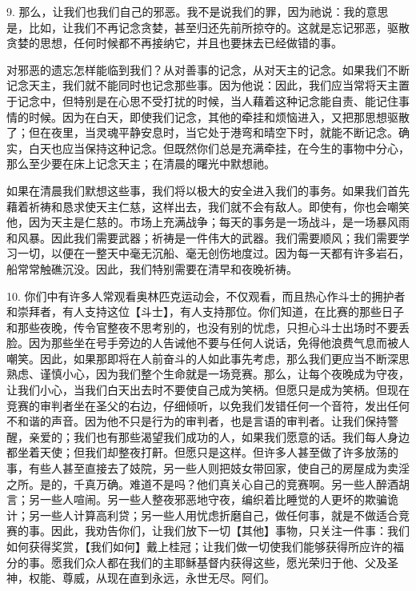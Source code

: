 9. 那么，让我们也我们自己的邪恶。我不是说我们的罪，因为祂说：我的意思是，比如，让我们不再记念贪婪，甚至归还先前所掠夺的。这就是忘记邪恶，驱散贪婪的思想，任何时候都不再接纳它，并且也要抹去已经做错的事。\par

对邪恶的遗忘怎样能临到我们？从对善事的记念，从对天主的记念。如果我们不断记念天主，我们就不能同时也记念那些事。因为他说：因此，我们应当常将天主置于记念中，但特别是在心思不受打扰的时候，当人藉着这种记念能自责、能记住事情的时候。因为在白天，即使我们记念，其他的牵挂和烦恼进入，又把那思想驱散了；但在夜里，当灵魂平静安息时，当它处于港弯和晴空下时，就能不断记念。确实，白天也应当保持这种记念。但既然你们总是充满牵挂，在今生的事物中分心，那么至少要在床上记念天主；在清晨的曙光中默想祂。\par

如果在清晨我们默想这些事，我们将以极大的安全进入我们的事务。如果我们首先藉着祈祷和恳求使天主仁慈，这样出去，我们就不会有敌人。即使有，你也会嘲笑他，因为天主是仁慈的。市场上充满战争；每天的事务是一场战斗，是一场暴风雨和风暴。因此我们需要武器；祈祷是一件伟大的武器。我们需要顺风；我们需要学习一切，以便在一整天中毫无沉船、毫无创伤地度过。因为每一天都有许多岩石，船常常触礁沉没。因此，我们特别需要在清早和夜晚祈祷。\par

10. 你们中有许多人常观看奥林匹克运动会，不仅观看，而且热心作斗士的拥护者和崇拜者，有人支持这位【斗士】，有人支持那位。你们知道，在比赛的那些日子和那些夜晚，传令官整夜不思考别的，也没有别的忧虑，只担心斗士出场时不要丢脸。因为那些坐在号手旁边的人告诫他不要与任何人说话，免得他浪费气息而被人嘲笑。因此，如果那即将在人前奋斗的人如此事先考虑，那么我们更应当不断深思熟虑、谨慎小心，因为我们整个生命就是一场竞赛。那么，让每个夜晚成为守夜，让我们小心，当我们白天出去时不要使自己成为笑柄。但愿只是成为笑柄。但现在竞赛的审判者坐在圣父的右边，仔细倾听，以免我们发错任何一个音符，发出任何不和谐的声音。因为他不只是行为的审判者，也是言语的审判者。让我们保持警醒，亲爱的；我们也有那些渴望我们成功的人，如果我们愿意的话。我们每人身边都坐着天使；但我们却整夜打鼾。但愿只是这样。但许多人甚至做了许多放荡的事，有些人甚至直接去了妓院，另一些人则把妓女带回家，使自己的房屋成为卖淫之所。是的，千真万确。难道不是吗？他们真关心自己的竞赛啊。另一些人醉酒胡言；另一些人喧闹。另一些人整夜邪恶地守夜，编织着比睡觉的人更坏的欺骗诡计；另一些人计算高利贷；另一些人用忧虑折磨自己，做任何事，就是不做适合竞赛的事。因此，我劝告你们，让我们放下一切【其他】事物，只关注一件事：我们如何获得奖赏，【我们如何】戴上桂冠；让我们做一切使我们能够获得所应许的福分的事。愿我们众人都在我们的主耶稣基督内获得这些，愿光荣归于他、父及圣神，权能、尊威，从现在直到永远，永世无尽。阿们。\par

